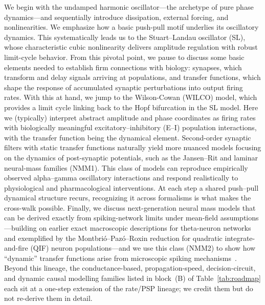 \documentclass[11pt]{article}
\numberwithin{equation}{section}
\newcommand{\rev}[1]{\begingroup\color{black}#1\endgroup}
\begin{document}
We begin with the undamped harmonic oscillator—the archetype of pure phase dynamics—and sequentially introduce dissipation, external forcing, and nonlinearities. We emphasize how a basic push-pull motif underlies its oscillatory dynamics.  This systematically leads us to the Stuart–Landau oscillator (SL), whose characteristic cubic nonlinearity delivers amplitude regulation with robust limit-cycle behavior. From this pivotal point, we pause to discuss some basic elements needed to establish firm connections with biology: synapses, which transform and delay signals arriving at populations, and transfer functions, which shape the response of accumulated synaptic perturbations into output firing rates. 
With this at hand, we jump to the Wilson-Cowan (WILCO) model, which provides a limit cycle linking back to the Hopf bifurcation in the SL model. Here we (typically) interpret abstract amplitude and phase coordinates as firing rates with biologically meaningful excitatory–inhibitory (E–I) population interactions, with the transfer function being the dynamical element. 
Second-order synaptic filters with static transfer functions naturally yield more nuanced models focusing on the dynamics of post-synaptic potentials, such as the Jansen–Rit and laminar neural-mass families (NMM1). This class of models can reproduce empirically observed alpha–gamma oscillatory interactions and respond realistically to physiological and pharmacological interventions.  \rev{At each step a shared push--pull dynamical structure recurs, recognizing it across formalisms is what makes the cross-walk possible.  Finally, we discuss next-generation neural mass models that can be derived exactly from spiking-network limits under mean-field assumptions—building on earlier exact macroscopic descriptions for theta-neuron networks and exemplified by the Montbrió–Pazó–Roxin reduction for quadratic integrate-and-fire (QIF) neuron  populations—and we use this class (NMM2) to show how ``dynamic'' transfer functions arise from microscopic spiking mechanisms~\cite{Montbrio:2015aa,so2014networks,luke2013complete}. Beyond this lineage, the conductance-based, propagation-speed, decision-circuit, and dynamic causal modelling families listed in block~(B) of Table~\ref{tab:roadmap} each sit at a one-step extension of the rate/PSP lineage; we credit them but do not re-derive them in detail.}


\end{document}
